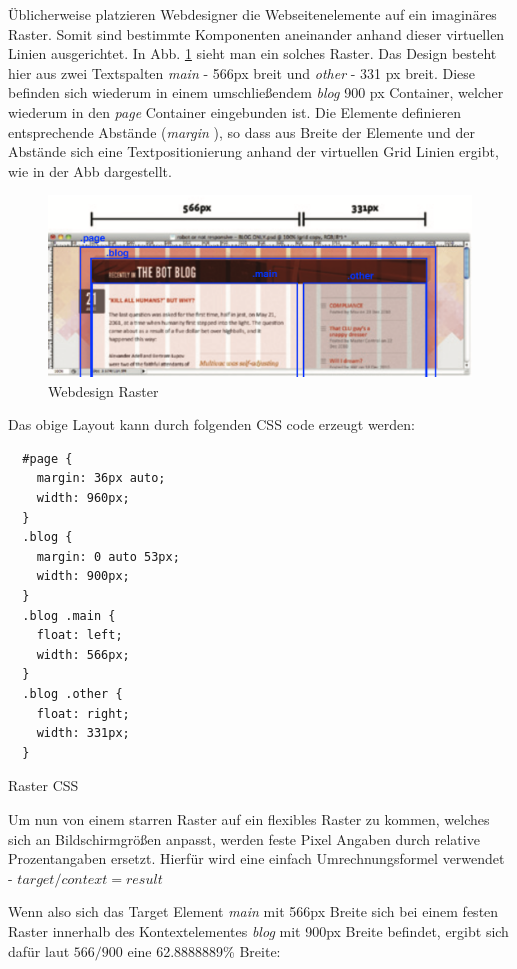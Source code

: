 Üblicherweise platzieren Webdesigner die Webseitenelemente auf ein imaginäres Raster. Somit sind bestimmte Komponenten aneinander anhand dieser virtuellen Linien ausgerichtet. In Abb. \ref{fig:grid} sieht man ein solches Raster. Das Design besteht hier aus zwei Textspalten \emph{main} - 566px breit und \emph{other} - 331 px breit. Diese befinden sich wiederum in einem umschließendem  \emph{blog} 900 px Container, welcher wiederum in den \emph{page} Container eingebunden ist. Die Elemente definieren entsprechende Abstände (\emph{margin} ), so dass aus Breite der Elemente und der Abstände sich eine Textpositionierung anhand der virtuellen Grid Linien ergibt, wie in der Abb dargestellt.

\begin{figure}[htp]     %
\centering
\includegraphics[width=1.0\textwidth]{images/grid} 
\caption{Webdesign Raster}\label{fig:grid}
\end{figure}

Das obige Layout kann durch folgenden CSS code erzeugt werden:

\begin{listing}[H]
\begin{verbatim}
  #page {
    margin: 36px auto;
    width: 960px;
  }
  .blog {
    margin: 0 auto 53px;
    width: 900px;
  }
  .blog .main {
    float: left;
    width: 566px;
  }
  .blog .other {
    float: right;
    width: 331px;
  }
\end{verbatim}
\caption{Raster CSS}
\label{lst:grid_css}
\end{listing}

Um nun von einem starren Raster auf ein flexibles Raster zu kommen, welches sich an Bildschirmgrößen anpasst, werden feste Pixel Angaben durch relative Prozentangaben ersetzt. Hierfür wird eine einfach Umrechnungsformel verwendet - $target / context = result$

Wenn also sich das Target Element \emph{main} mit 566px Breite sich bei einem festen Raster innerhalb des Kontextelementes \emph{blog} mit 900px Breite befindet, ergibt sich dafür laut $566 / 900$ eine 62.8888889\% Breite:
 
